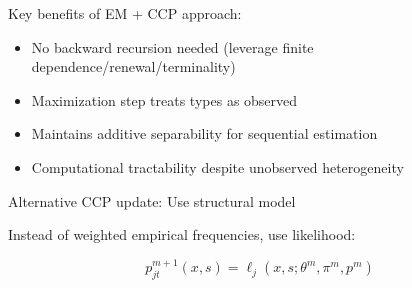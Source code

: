 \documentclass[aspectratio=169]{beamer}
\begin{document}
\begin{frame}

Key benefits of EM + CCP approach:

\bigskip

\begin{itemize}
\itemsep1.5em
\item<2-> No backward recursion needed (leverage finite dependence/renewal/terminality)
\item<3-> Maximization step treats types as observed
\item<4-> Maintains additive separability for sequential estimation
\item<5-> Computational tractability despite unobserved heterogeneity
\end{itemize}

\end{frame}

\begin{frame}

Alternative CCP update: Use structural model

\bigskip

Instead of weighted empirical frequencies, use likelihood:

$$
p_{jt}^{m+1}(x,s) = \ell_j(x, s; \theta^m, \pi^m, p^m)
$$

\bigskip


\end{frame}
\end{document}
